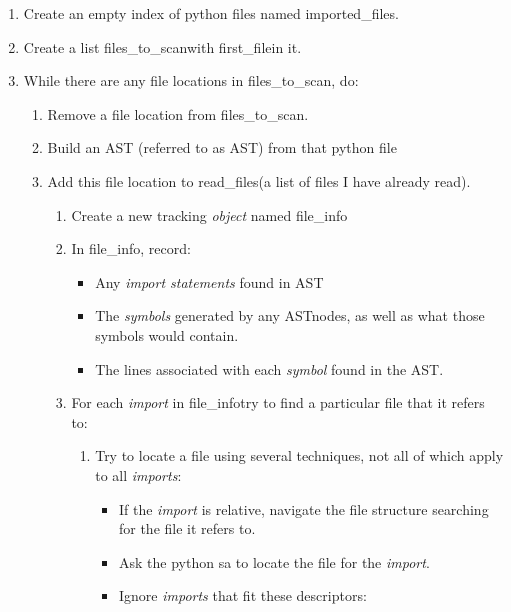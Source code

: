\documentclass[a4paper,man,natbib,floatsintext]{apa6}
\begin{document}
  \begin{enumerate}
    \item Create an empty index of python files named \textlangle imported\_files\textrangle.
    \item Create a list \textlangle files\_to\_scan\textrangle with \textlangle first\_file\textrangle in it. 
    \item While there are any file locations in \textlangle files\_to\_scan\textrangle, do:
    \begin{enumerate}
      \item Remove a file location from \textlangle files\_to\_scan\textrangle.
      \item Build an AST (referred to as \textlangle AST\textrangle) from that \Gls{python} file
      \item Add this file location to \textlangle read\_files\textrangle (a list of files I have already read).
      \begin{enumerate}
        \item Create a new tracking \textit{object} named \textlangle file\_info\textrangle
        \item In \textlangle file\_info\textrangle, record:
        \begin{itemize}
          \item Any \textit{import statements} found in \textlangle AST\textrangle
          \item The \textit{symbols} generated by any \textlangle AST\textrangle nodes, as well as what those symbols would contain.
          \item The lines associated with each \textit{symbol} found in the \textlangle AST\textrangle.
        \end{itemize}
        \item For each \textit{import} in \textlangle file\_info\textrangle try to find a particular file that it refers to:
        \begin{enumerate}
          \item Try to locate a file using several techniques, not all of which apply to all \textit{imports}:
          \begin{itemize}
            \item If the \textit{import} is relative, navigate the file structure searching for the file it refers to.
            \item Ask the \Gls{python} \gls{sa} to locate the file for the \textit{import}.
            \item Ignore \textit{imports} that fit these descriptors:

\end{itemize}
\end{enumerate}
\end{enumerate}
\end{enumerate}
\end{enumerate}
\end{document}
